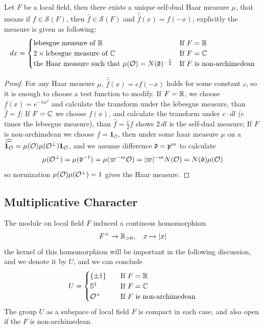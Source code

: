 \begin{proposition} \label{selfdualmeasure}
    Let \(F\) be a local field, then there exists a unique self-dual Haar measure \(\mu\), that means if \(f \in \mathcal{S}(F)\), then \(\hat{f} \in \mathcal{S}(F)\) and \(\widehat{\hat{f}}(x) = f(-x)\), explicitly the measure is given as following:
    \[dx = \begin{cases}
        \text{lebesgue measure of } \mathbb{R} &\text{If } F = \mathbb{R} \\
        2 \times \text{lebesgue measure of } \mathbb{C} &\text{If } F = \mathbb{C} \\
        \text{the Haar measure such that } \mu(\mathcal O) = N(\mathfrak{d})^{-\frac{1}{2}} &\text{If } F \text{ is non-archimedean}
    \end{cases}\]

\end{proposition}

\begin{proof}
    For any Haar measure \(\mu\), \(\widehat{\widehat{f}}(x) = cf(-x)\) holds for some constant \(c\), so it is enough to choose a test function to modify. If \(F = \mathbb{R}\), we choose \(f(x) = e^{-\pi x^2}\) and calculate the transform under the lebesgue measure, than \(\hat{f} = f\); If \(F = \mathbb{C}\) we choose \(f(x)\), and calculate the transform under \(c\cdot dl\) (c times the lebesgue measure), than \(\hat{f} = \frac{c}{2}f\) shows \(2\,dl\) is the self-dual measure; If \(F\) is non-archimdean we choose \(f = \mathbf{1}_{\mathcal O}\), then under some haar measure \(\mu\) on a \(\widehat{\widehat{\mathbf{1}_{\mathcal{O}}}} = \mu(\mathcal{O})\mu(\mathcal{O}^{\perp})\mathbf{1}_{\mathcal{O}}\), and we assume difference \(\mathfrak{d} = \mathfrak{p}^{m}\) to calculate
    \[\mu(\mathcal{O}^{\perp}) = \mu(\mathfrak{d}^{-1}) = \mu(\varpi^{-m}\mathcal{O}) = |\varpi|^{-m} N(\mathcal{O}) = N(\mathfrak{d})\mu(\mathcal{O})\]
    so normization \(\mu(\mathcal{O})\mu(\mathcal{O}^{\perp}) = 1\) gives the Haar measure.
\end{proof}

\subsection{Multiplicative Character}
The module on local field \(F\) induced a continous homomorphism
\[F^\times \to \mathbb{R}_{>0}, \quad x \mapsto |x|\]
the kernel of this homomorphism will be important in the following discussion, and we denote it by \(U\), and we can conclude
\[U = \begin{cases}
    \{\pm 1\} \quad &\text{If } F = \mathbb{R} \\
    \mathbb{S}^1 \quad &\text{If } F = \mathbb{C} \\
    \mathcal O^\times \quad &\text{If } F \text{ is non-archimedean}
\end{cases}\]
The group \(U\) as a subspace of local field \(F\) is compact in each case, and also open if the \(F\) is non-archimedean.




